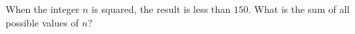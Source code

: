 When the integer $n$ is squared, the result is less than $150$. What is the sum of all possible values of $n$?
